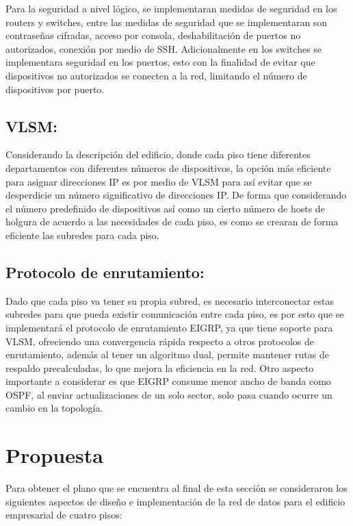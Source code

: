 \documentclass[letterpaper,11pt]{article}
\begin{document}
    Para la seguridad a nivel lógico, se implementaran medidas de seguridad en los routers y switches, entre las medidas de seguridad que se implementaran son contraseñas cifradas, acceso por consola, deshabilitación de puertos no autorizados, conexión por medio de SSH. Adicionalmente en los switches se implementara seguridad en los puertos, esto con la finalidad de evitar que dispositivos no autorizados se conecten a la red, limitando el número de dispositivos por puerto.

    \subsection{VLSM:}

    Considerando la descripción del edificio, donde cada piso tiene diferentes departamentos con diferentes números de dispositivos, la opción más eficiente para asignar direcciones IP es por medio de VLSM para así evitar que se desperdicie un número significativo de direcciones IP. De forma que considerando el número predefinido de dispositivos así como un cierto número de hosts de holgura de acuerdo a las necesidades de cada piso, es como se crearan de forma eficiente las subredes para cada piso.

    \subsection{Protocolo de enrutamiento:}

    Dado que cada piso va tener su propia subred, es necesario interconectar estas subredes para que pueda existir comunicación entre cada piso, es por esto que se implementará el protocolo de enrutamiento EIGRP, ya que tiene soporte para VLSM, ofreciendo una convergencia rápida respecto a otros protocolos de enrutamiento, además al tener un algoritmo dual, permite mantener rutas de respaldo precalculadas, lo que mejora la eficiencia en la red. Otro aspecto importante a considerar es que EIGRP consume menor ancho de banda como OSPF, al enviar actualizaciones de un solo sector, solo pasa cuando ocurre un cambio en la topología.

    \section{Propuesta}

    Para obtener el plano que se encuentra al final de esta sección se consideraron los siguientes aspectos de diseño e implementación de la red de datos para el edificio empresarial de cuatro pisos:
\end{document}
